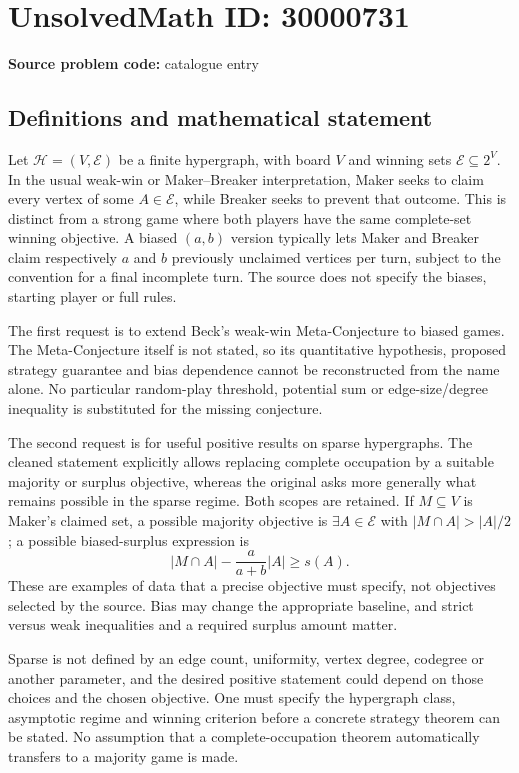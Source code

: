 \documentclass[11pt]{article}
\begin{document}
\section*{UnsolvedMath ID: 30000731}
\textbf{Source problem code:} catalogue entry
\subsection{Definitions and mathematical statement}
Let \(\mathcal H=(V,\mathcal E)\) be a finite hypergraph, with board \(V\) and winning sets \(\mathcal E\subseteq2^V\). In the usual weak-win or Maker--Breaker interpretation, Maker seeks to claim every vertex of some \(A\in\mathcal E\), while Breaker seeks to prevent that outcome. This is distinct from a strong game where both players have the same complete-set winning objective. A biased \((a,b)\) version typically lets Maker and Breaker claim respectively \(a\) and \(b\) previously unclaimed vertices per turn, subject to the convention for a final incomplete turn. The source does not specify the biases, starting player or full rules.

The first request is to extend Beck's weak-win Meta-Conjecture to biased games. The Meta-Conjecture itself is not stated, so its quantitative hypothesis, proposed strategy guarantee and bias dependence cannot be reconstructed from the name alone. No particular random-play threshold, potential sum or edge-size/degree inequality is substituted for the missing conjecture.

The second request is for useful positive results on sparse hypergraphs. The cleaned statement explicitly allows replacing complete occupation by a suitable majority or surplus objective, whereas the original asks more generally what remains possible in the sparse regime. Both scopes are retained. If \(M\subseteq V\) is Maker's claimed set, a possible majority objective is \(\exists A\in\mathcal E\) with \(|M\cap A|>|A|/2\); a possible biased-surplus expression is
\[
 |M\cap A|-\frac{a}{a+b}|A|\geq s(A).
\]
These are examples of data that a precise objective must specify, not objectives selected by the source. Bias may change the appropriate baseline, and strict versus weak inequalities and a required surplus amount matter.

Sparse is not defined by an edge count, uniformity, vertex degree, codegree or another parameter, and the desired positive statement could depend on those choices and the chosen objective. One must specify the hypergraph class, asymptotic regime and winning criterion before a concrete strategy theorem can be stated. No assumption that a complete-occupation theorem automatically transfers to a majority game is made.
\end{document}
